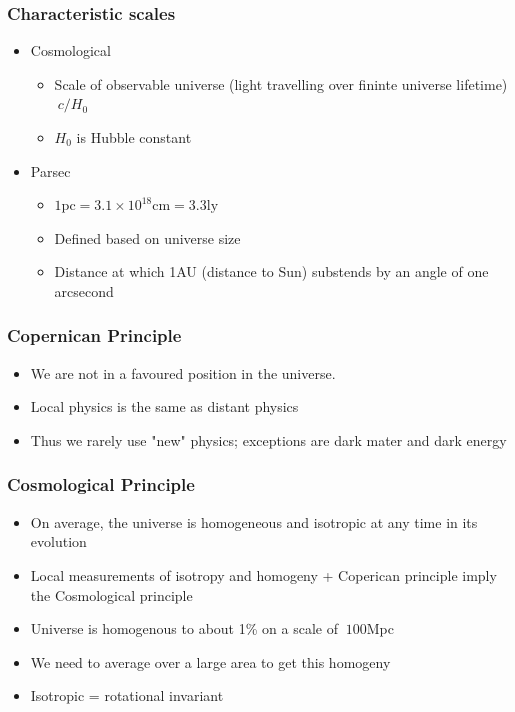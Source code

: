 \documentclass[a4paper]{article} %
\begin{document}
\subsubsection{Characteristic scales}
\begin{itemize}
\item Cosmological
\begin{itemize}
\item Scale of observable universe (light travelling over fininte universe lifetime) $~c/H_0$
\item $H_0$ is Hubble constant
\end{itemize}
\item Parsec
\begin{itemize}
\item $1\text{pc}=3.1\times 10^{18}\text{cm}=3.3\text{ly}$
\item Defined based on universe size
\item Distance at which 1AU (distance to Sun) substends by an angle of one arcsecond
\end{itemize}
\end{itemize}

\subsubsection{Copernican Principle}
\begin{itemize}
\item We are not in a favoured position in the universe.
\item Local physics is the same as distant physics
\item Thus we rarely use "new" physics; exceptions are dark mater and dark energy
\end{itemize}

\subsubsection{Cosmological Principle}
\begin{itemize}
\item On average, the universe is homogeneous and isotropic at any time in its evolution
\item Local measurements of isotropy and homogeny + Coperican principle imply the Cosmological principle
\item Universe is homogenous to about 1\% on a scale of $~100$Mpc
\item We need to average over a large area to get this homogeny
\item Isotropic = rotational invariant
\end{itemize}
\end{document}
